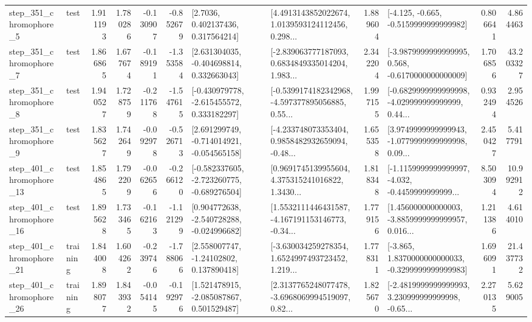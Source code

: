 \begin{tabular}{llrrrrllrlrr}
   step\_351\_chromophore\_5 &      test &      1.911193 &    1.780286 &     -0.130907 & -0.852679 &          [2.7036, 0.402137436, 0.317564214] &  [4.4913143852022674, 1.0139593124112456, 0.298... &       1.889604 &              [-4.125, -0.665, -0.5159999999999982] &            0.806641 &          4.864463 \\
   step\_351\_chromophore\_7 &      test &      1.866865 &    1.677674 &     -0.189191 & -1.353584 &    [2.631304035, -0.404698814, 0.332663043] &  [-2.839063777187093, 0.6834849335014204, 1.983... &       2.342204 &  [-3.9879999999999995, 0.568, -0.6170000000000009] &            1.706856 &         43.203327 \\
   step\_351\_chromophore\_8 &      test &      1.940527 &    1.728759 &     -0.211768 & -1.547615 &   [-0.430979778, -2.615455572, 0.333182297] &  [-0.5399174182342968, -4.597377895056885, 0.55... &       1.997155 &  [-0.6829999999999998, -4.029999999999999, 0.44... &            0.932494 &          2.954526 \\
   step\_351\_chromophore\_9 &      test &      1.835627 &    1.742649 &     -0.092978 & -0.526713 &   [2.691299749, -0.714014921, -0.054565158] &  [-4.233748073353404, 0.9858482932659094, -0.48... &       1.655358 &  [3.9749999999999943, -1.0779999999999998, 0.09... &            2.450427 &          5.417791 \\
  step\_401\_chromophore\_13 &      test &      1.854865 &    1.792209 &     -0.062656 & -0.266120 &  [-0.582337605, -2.723260775, -0.689276504] &  [0.9691745139955604, 4.375315241016822, 1.3430... &       1.818348 &  [-1.1159999999999997, -4.032, -0.4459999999999... &            8.503094 &         10.992912 \\
  step\_401\_chromophore\_16 &      test &      1.895628 &    1.733465 &     -0.162163 & -1.121299 &   [0.904772638, -2.540728288, -0.024996682] &  [1.5532111446431587, -4.167191153146773, -0.34... &       1.779156 &  [1.456000000000003, -3.8859999999999957, 0.016... &            1.211386 &          4.614010 \\
  step\_401\_chromophore\_21 &  training &      1.844008 &    1.604262 &     -0.239746 & -1.788066 &     [2.558007747, -1.24102802, 0.137890418] &  [-3.630034259278354, 1.6524997493723452, 1.219... &       1.778311 &  [-3.865, 1.8370000000000033, -0.3299999999999983] &            1.696091 &         21.437732 \\
  step\_401\_chromophore\_26 &  training &      1.898077 &    1.843932 &     -0.054145 & -0.192976 &    [1.521478915, -2.085087867, 0.501529487] &  [2.3137765248077478, -3.6968069994519097, 0.82... &       1.825670 &  [-2.4819999999999993, 3.230999999999998, -0.65... &            2.270135 &          5.629005 \\

\end{tabular}
